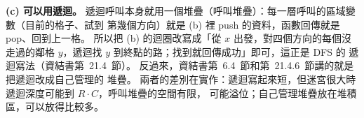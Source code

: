 \begin{pastsoln}
\textbf{(c) 可以用遞迴。} 遞迴呼叫本身就用一個堆疊（呼叫堆疊）：每一層呼叫的區域變數（目前的格子、試到
第幾個方向）就是 (b) 裡 push 的資料，函數回傳就是 pop、回到上一格。 所以把 (b) 的迴圈改寫成「從 $x$
出發，對四個方向的每個沒走過的鄰格 $y$，遞迴找 $y$ 到終點的路；找到就回傳成功」即可，這正是 DFS 的
遞迴寫法（資結書第~21.4~節）。 反過來，資結書第~6.4~節和第~21.4.6~節講的就是把遞迴改成自己管理的
堆疊。 兩者的差別在實作：遞迴寫起來短，但迷宮很大時遞迴深度可能到 $R \cdot C$，呼叫堆疊的空間有限，
可能溢位；自己管理堆疊放在堆積區，可以放得比較多。
\end{pastsoln}
